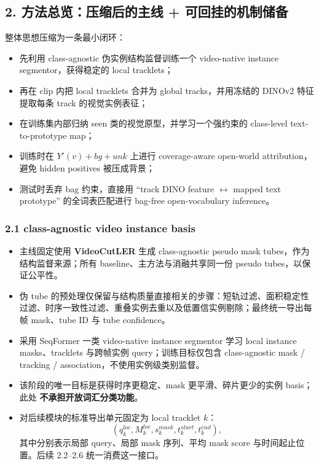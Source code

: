 \documentclass[UTF8]{ctexart}
\begin{document}
\par\noindent\hrulefill\par

\subsection*{2. 方法总览：压缩后的主线 + 可回挂的机制储备}
整体思想压缩为一条最小闭环：
\begin{itemize}
\item 先利用 class-agnostic 伪实例结构监督训练一个 video-native instance segmentor，获得稳定的 local tracklets；
\item 再在 clip 内把 local tracklets 合并为 global tracks，并用冻结的 DINOv2 特征提取每条 track 的视觉实例表征；
\item 在训练集内部归纳 seen 类的视觉原型，并学习一个强约束的 class-level text-to-prototype map；
\item 训练时在 $Y'(v)+bg+unk$ 上进行 coverage-aware open-world attribution，避免 hidden positives 被压成背景；
\item 测试时丢弃 bag 约束，直接用 ``track DINO feature $\leftrightarrow$ mapped text prototype'' 的全词表匹配进行 bag-free open-vocabulary inference。
\end{itemize}

\subsubsection*{2.1 class-agnostic video instance basis}
\begin{itemize}
\item 主线固定使用 \textbf{VideoCutLER} 生成 class-agnostic pseudo mask tubes，作为结构监督来源；所有 baseline、主方法与消融共享同一份 pseudo tubes，以保证公平性。
\item 伪 tube 的预处理仅保留与结构质量直接相关的步骤：短轨过滤、面积稳定性过滤、时序一致性过滤、重叠实例去重以及低置信实例剔除；最终统一导出每帧 mask、tube ID 与 tube confidence。
\item 采用 SeqFormer 一类 video-native instance segmentor 学习 local instance masks、tracklets 与跨帧实例 query；训练目标仅包含 class-agnostic mask / tracking / association，不使用实例级类别监督。
\item 该阶段的唯一目标是获得时序更稳定、mask 更平滑、碎片更少的实例 basis；此处 \textbf{不承担开放词汇分类功能}。
\item 对后续模块的标准导出单元固定为 local tracklet $k$：
\[
(q_k^{loc}, M_k^{loc}, s_k^{mask}, t_k^{start}, t_k^{end}),
\]
其中分别表示局部 query、局部 mask 序列、平均 mask score 与时间起止位置。后续 2.2--2.6 统一消费这一接口。
\end{itemize}
\end{document}

